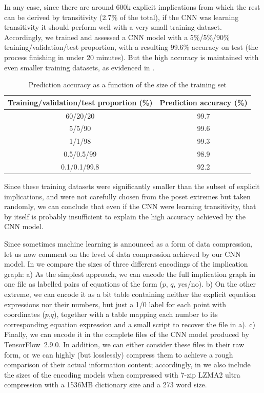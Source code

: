\documentclass[12pt]{amsart}
\theoremstyle{definition}
\begin{document}
\smallskip

In any case, since there are around 600k explicit implications from which the rest can be derived by transitivity (2.7\% of the total), if the CNN was learning transitivity it should perform well with a very small training dataset. Accordingly, we trained and assessed a CNN model with a 5\%/5\%/90\% training/validation/test proportion, with a resulting 99.6\% accuracy on test (the process finishing in under 20 minutes). But the high accuracy is maintained with even smaller training datasets, as evidenced in .
\begin{table}
\centering
\caption{Prediction accuracy as a function of the size of the training set}
\begin{tabular}{cc}
\toprule
  Training/validation/test proportion (\%) & Prediction accuracy (\%) \\\midrule
  60/20/20 & 99.7 \\
  5/5/90 & 99.6 \\
  1/1/98 & 99.3 \\
  0.5/0.5/99 & 98.9 \\
  0.1/0.1/99.8 & 92.2 \\
  \bottomrule
\end{tabular}
\label{table:prediction-accuracy}
\end{table}

\noindent Since these training datasets were significantly smaller than the subset of explicit implications, and were not carefully chosen from the poset extremes but taken randomly, we can conclude that even if the CNN were learning transitivity, that by itself is probably insufficient to explain the high accuracy achieved by the CNN model.

\smallskip

Since sometimes machine learning is announced as a form of data compression, let us now comment on the level of data compression achieved by our CNN model. In  we compare the sizes of three different encodings of the implication graph: a) As the simplest approach, we can encode the full implication graph in one file as labelled pairs of equations of the form ($p$, $q$, yes/no). b) On the other extreme, we can encode it as a bit table containing neither the explicit equation expressions nor their numbers, but just a 1/0 label for each point with coordinates ($p$,$q$), together with a table mapping each number to its corresponding equation expression and a small script to recover the file in a). c) Finally, we can encode it in the complete files of the CNN model produced by TensorFlow 2.9.0. In addition, we can either consider these files in their raw form, or we can highly (but losslessly) compress them to achieve a rough comparison of their actual information content; accordingly, in  we also include the sizes of the encoding models when compressed with 7-zip LZMA2 ultra compression with a 1536MB dictionary size and a 273 word size.
\end{document}
